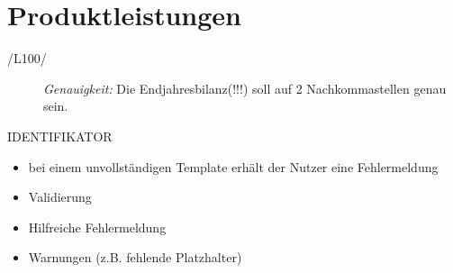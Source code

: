 
\section{Produktleistungen}

\begin{description}
  \item[/L100/]
    \textit{Genauigkeit:}
    	Die Endjahresbilanz(!!!) soll auf 2 Nachkommastellen genau sein.
\end{description}

IDENTIFIKATOR
\begin{itemize}
	\item bei einem unvollständigen Template erhält der Nutzer eine Fehlermeldung
	\item Validierung
	\item Hilfreiche Fehlermeldung
	\item Warnungen (z.B. fehlende Platzhalter)
\end{itemize}

